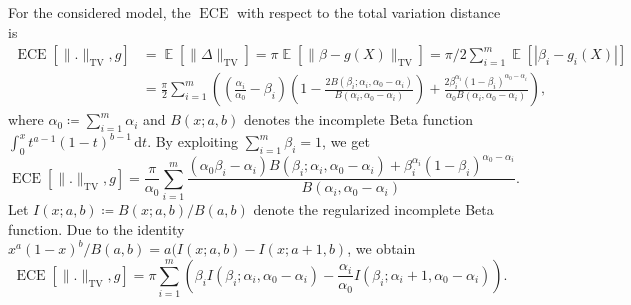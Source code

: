 \documentclass{article}
\DeclareMathOperator{\Expect}{\mathbb{E}}
\DeclareMathOperator{\ECE}{ECE}
\begin{document}
For the considered model, the $\ECE$ with respect to the total variation
distance is
\begin{equation*}
  \begin{split}
    \ECE[\|.\|_{\mathrm{TV}},g] &= \Expect[\|\Delta\|_{\mathrm{TV}}] = \pi \Expect[\|\beta - g(X)\|_{\mathrm{TV}}] = \pi/2 \sum_{i=1}^m \Expect[|\beta_i - g_i(X)|] \\
    &= \frac{\pi}{2} \sum_{i=1}^m \left(\left(\frac{\alpha_i}{\alpha_0} - \beta_i\right) \left(1 - \frac{2 B(\beta_i; \alpha_i, \alpha_0 - \alpha_i)}{B(\alpha_i,\alpha_0-\alpha_i)}\right) + \frac{2\beta_i^{\alpha_i} {(1-\beta_i)}^{\alpha_0-\alpha_i}}{\alpha_0 B(\alpha_i,\alpha_0-\alpha_i)}\right),
  \end{split}
\end{equation*}
where $\alpha_0 \coloneqq \sum_{i=1}^m \alpha_i$ and $B(x; a,b)$ denotes the
incomplete Beta function $\int_0^x t^{a-1} {(1-t)}^{b-1} \,\mathrm{d}t$. By
exploiting $\sum_{i=1}^m \beta_i = 1$, we get
\begin{equation*}
  \ECE[\|.\|_{\mathrm{TV}},g] = \frac{\pi}{\alpha_0} \sum_{i=1}^m \frac{(\alpha_0 \beta_i - \alpha_i)B(\beta_i; \alpha_i, \alpha_0-\alpha_i) + \beta_i^{\alpha_i} {(1-\beta_i)}^{\alpha_0-\alpha_i}}{B(\alpha_i,\alpha_0-\alpha_i)}.
\end{equation*}
Let $I(x; a, b) \coloneqq B(x; a, b) / B(a, b)$ denote the regularized
incomplete Beta function. Due to the identity
$x^a (1-x)^b / B(a, b) = a (I(x; a, b) - I(x; a+1, b)$, we obtain
\begin{equation*}
  \ECE[\|.\|_{\mathrm{TV}},g] = \pi \sum_{i=1}^m \left(\beta_i I(\beta_i; \alpha_i, \alpha_0 - \alpha_i) - \frac{\alpha_i}{\alpha_0} I(\beta_i; \alpha_i + 1, \alpha_0 - \alpha_i)\right).
\end{equation*}
\end{document}
